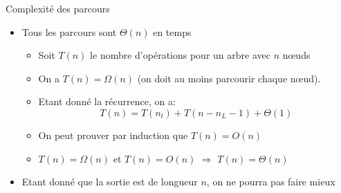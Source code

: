 \begin{frame}{Complexité des parcours}
\begin{itemize}
\item Tous les parcours sont $\Theta(n)$ en temps
\begin{itemize}
\item Soit $T(n)$ le nombre d'opérations pour un arbre avec $n$ n\oe uds
\item On a $T(n)=\Omega(n)$ (on doit au moins parcourir chaque n\oe ud).
\item Etant donné la récurrence, on a:
$$T(n)=T(n_l)+T(n-n_L-1) + \Theta(1)$$
\item On peut prouver par induction que $T(n)=O(n)$
\item $T(n)=\Omega(n)$ et $T(n)=O(n)$ $\Rightarrow$ $T(n)=\Theta(n)$
\end{itemize}
\item Etant donné que la sortie est de longueur $n$, on ne pourra pas faire mieux
\end{itemize}

\end{frame}

